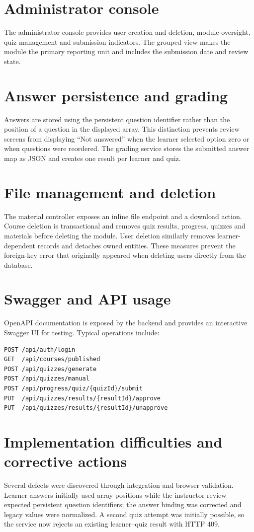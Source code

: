 \section{Administrator console}
The administrator console provides user creation and deletion, module
oversight, quiz management and submission indicators. The grouped view makes
the module the primary reporting unit and includes the submission date and
review state.

\section{Answer persistence and grading}
Answers are stored using the persistent question identifier rather than the
position of a question in the displayed array. This distinction prevents
review screens from displaying ``Not answered'' when the learner selected
option zero or when questions were reordered. The grading service stores the
submitted answer map as JSON and creates one result per learner and quiz.

\section{File management and deletion}
The material controller exposes an inline file endpoint and a download action.
Course deletion is transactional and removes quiz results, progress, quizzes
and materials before deleting the module. User deletion similarly removes
learner-dependent records and detaches owned entities. These measures prevent
the foreign-key error that originally appeared when deleting users directly
from the database.

\section{Swagger and API usage}
OpenAPI documentation is exposed by the backend and provides an interactive
Swagger UI for testing. Typical operations include:
\begin{lstlisting}
POST /api/auth/login
GET  /api/courses/published
POST /api/quizzes/generate
POST /api/quizzes/manual
POST /api/progress/quiz/{quizId}/submit
PUT  /api/quizzes/results/{resultId}/approve
PUT  /api/quizzes/results/{resultId}/unapprove
\end{lstlisting}

\section{Implementation difficulties and corrective actions}
Several defects were discovered through integration and browser validation.
Learner answers initially used array positions while the instructor review
expected persistent question identifiers; the answer binding was corrected and
legacy values were normalized. A second quiz attempt was initially possible,
so the service now rejects an existing learner--quiz result with HTTP 409.

